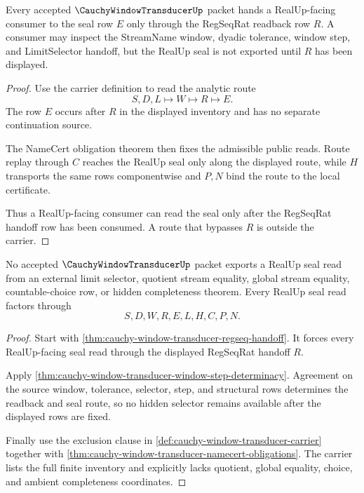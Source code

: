 \begin{theorem}
\label{thm:cauchy-window-transducer-regseq-handoff}
Every accepted $\CauchyWindowTransducerUp$ packet hands a RealUp-facing consumer to the seal row $E$ only through the RegSeqRat readback row $R$. A consumer may inspect the StreamName window, dyadic tolerance, window step, and LimitSelector handoff, but the RealUp seal is not exported until $R$ has been displayed.
\end{theorem}
\begin{proof}
Use the carrier definition to read the analytic route
$$
S,D,L \longmapsto W \longmapsto R \longmapsto E.
$$
The row $E$ occurs after $R$ in the displayed inventory and has no separate continuation source.

The NameCert obligation theorem then fixes the admissible public reads. Route replay through $C$ reaches the RealUp seal only along the displayed route, while $H$ transports the same rows componentwise and $P,N$ bind the route to the local certificate.

Thus a RealUp-facing consumer can read the seal only after the RegSeqRat handoff row has been consumed. A route that bypasses $R$ is outside the carrier.
\end{proof}

\begin{theorem}
\label{thm:cauchy-window-transducer-real-seal-nonescape}
No accepted $\CauchyWindowTransducerUp$ packet exports a RealUp seal read from an external limit selector, quotient stream equality, global stream equality, countable-choice row, or hidden completeness theorem. Every RealUp seal read factors through
$$
S,D,W,R,E,L,H,C,P,N.
$$
\end{theorem}
\begin{proof}
Start with \autoref{thm:cauchy-window-transducer-regseq-handoff}. It forces every RealUp-facing seal read through the displayed RegSeqRat handoff $R$.

Apply \autoref{thm:cauchy-window-transducer-window-step-determinacy}. Agreement on the source window, tolerance, selector, step, and structural rows determines the readback and seal route, so no hidden selector remains available after the displayed rows are fixed.

Finally use the exclusion clause in \autoref{def:cauchy-window-transducer-carrier} together with \autoref{thm:cauchy-window-transducer-namecert-obligations}. The carrier lists the full finite inventory and explicitly lacks quotient, global equality, choice, and ambient completeness coordinates.
\end{proof}

